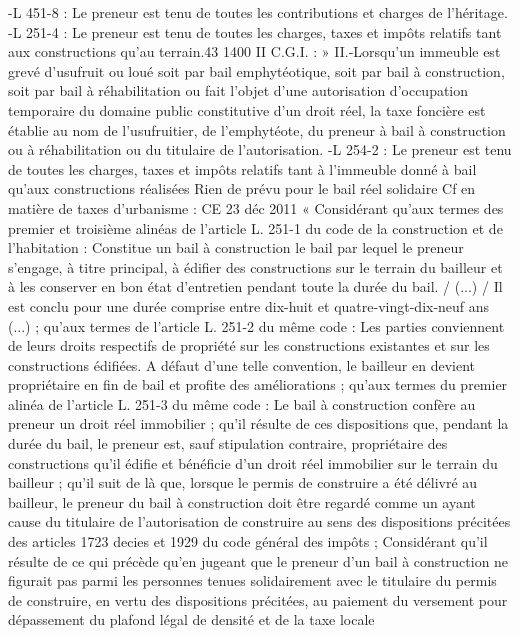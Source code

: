 \documentclass[11pt,a4paper]{report}
\begin{document}
	-L 451-8 : Le preneur est tenu de toutes les contributions et charges de l'héritage.
	-L 251-4 : Le preneur est tenu de toutes les charges, taxes et impôts relatifs tant aux constructions qu'au terrain.43
	1400 II C.G.I. : » II.-Lorsqu'un immeuble est grevé d'usufruit ou loué soit par bail emphytéotique, soit par bail à
	construction, soit par bail à réhabilitation ou fait l'objet d'une autorisation d'occupation temporaire du domaine
	public constitutive d'un droit réel, la taxe foncière est établie au nom de l'usufruitier, de l'emphytéote, du
	preneur à bail à construction ou à réhabilitation ou du titulaire de l'autorisation.
	-L 254-2 : Le preneur est tenu de toutes les charges, taxes et impôts relatifs tant à l'immeuble donné à bail
	qu'aux constructions réalisées
	Rien de prévu pour le bail réel solidaire
	Cf en matière de taxes d’urbanisme : CE 23 déc 2011  « Considérant qu'aux termes des premier et
	troisième alinéas de l'article L. 251-1 du code de la construction et de l'habitation : Constitue un bail à
	construction le bail par lequel le preneur s'engage, à titre principal, à édifier des constructions sur le terrain du
	bailleur et à les conserver en bon état d'entretien pendant toute la durée du bail. / (...) / Il est conclu pour une
	durée comprise entre dix-huit et quatre-vingt-dix-neuf ans (...) ; qu'aux termes de l'article L. 251-2 du même
	code : Les parties conviennent de leurs droits respectifs de propriété sur les constructions existantes et sur les
	constructions édifiées. A défaut d'une telle convention, le bailleur en devient propriétaire en fin de bail et profite
	des améliorations ; qu'aux termes du premier alinéa de l'article L. 251-3 du même code : Le bail à construction
	confère au preneur un droit réel immobilier ; qu'il résulte de ces dispositions que, pendant la durée du bail, le
	preneur est, sauf stipulation contraire, propriétaire des constructions qu'il édifie et bénéficie d'un droit réel
	immobilier sur le terrain du bailleur ; qu'il suit de là que, lorsque le permis de construire a été délivré au
	bailleur, le preneur du bail à construction doit être regardé comme un ayant cause du titulaire de l'autorisation
	de construire au sens des dispositions précitées des articles 1723 decies et 1929 du code général des impôts ;
	Considérant qu'il résulte de ce qui précède qu'en jugeant que le preneur d'un bail à construction ne figurait pas
	parmi les personnes tenues solidairement avec le titulaire du permis de construire, en vertu des dispositions
	précitées, au paiement du versement pour dépassement du plafond légal de densité et de la taxe locale
\end{document}
